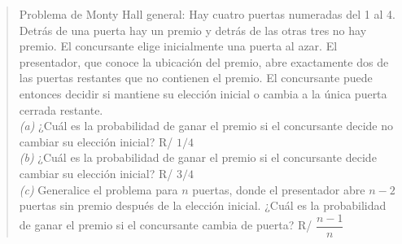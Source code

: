 \documentclass[11pt]{article}
\begin{document}
\begin{quote}
Problema de Monty Hall general: Hay cuatro puertas numeradas del 1 al 4. Detr\'as de una puerta hay un premio y detr\'as de las otras tres no hay premio. El concursante elige inicialmente una puerta al azar. El presentador, que conoce la ubicaci\'on del premio, abre exactamente dos de las puertas restantes que no contienen el premio. El concursante puede entonces decidir si mantiene su elecci\'on inicial o cambia a la \'unica puerta cerrada restante.\\
\emph{(a)} ¿Cu\'al es la probabilidad de ganar el premio si el concursante decide no cambiar su elecci\'on inicial? \hfill R/ $1/4$\\
\emph{(b)} ¿Cu\'al es la probabilidad de ganar el premio si el concursante decide cambiar su elecci\'on inicial? \hfill R/ $3/4$\\
\emph{(c)} Generalice el problema para $n$ puertas, donde el presentador abre $n-2$ puertas sin premio despu\'es de la elecci\'on inicial. ¿Cu\'al es la probabilidad de ganar el premio si el concursante cambia de puerta? \hfill R/ $\dfrac{n-1}{n}$
\end{quote}
\end{document}
